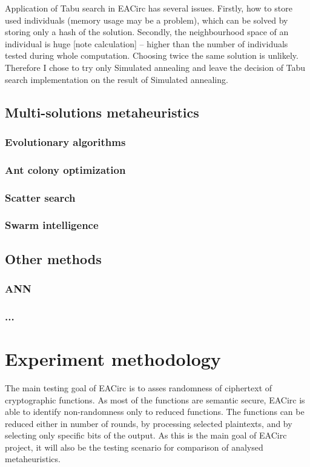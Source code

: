 \documentclass[
  print, %
  Table,   %
  nolof,     %
  nolot,     %
  draft, %
  11pt, %
  oneside  %
]{fithesis3}
\begin{document}
Application of Tabu search in EACirc has several issues. Firstly, how to store used individuals (memory usage may be a problem), which can be solved by storing only a hash of the solution. Secondly, the neighbourhood space of an individual is huge [note calculation] -- higher than the number of individuals tested during whole computation. Choosing twice the same solution is unlikely. Therefore I chose to try only Simulated annealing and leave the decision of Tabu search implementation on the result of Simulated annealing.

\section{Multi-solutions metaheuristics}
\subsection{Evolutionary algorithms}
\subsection{Ant colony optimization}
\subsection{Scatter search}
\subsection{Swarm intelligence}
\section{Other methods}
\subsection{ANN}
\subsection{...}

\chapter{Experiment methodology}

The main testing goal of EACirc is to asses randomness of ciphertext of cryptographic functions. As most of the functions are semantic secure, EACirc is able to identify non-randomness only to reduced functions. The functions can be reduced either in number of rounds, by processing selected plaintexts, and by selecting only specific bits of the output. As this is the main goal of EACirc project, it will also be the testing scenario for comparison of analysed metaheuristics.
\end{document}
